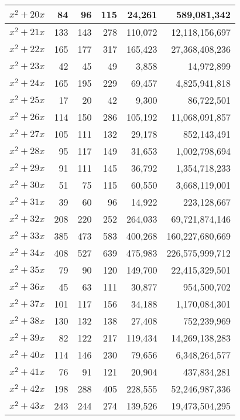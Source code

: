 \documentclass[a4paper]{amsproc}
\theoremstyle{plain}
\begin{document}
\begin{longtable}{ | l | r | r | r | r | r | }
$x^2 + 20x$ & 84 & 96 & 115 & 24{,}261 & 589{,}081{,}342 \\ \hline
$x^2 + 21x$ & 133 & 143 & 278 & 110{,}072 & 12{,}118{,}156{,}697 \\ \hline
$x^2 + 22x$ & 165 & 177 & 317 & 165{,}423 & 27{,}368{,}408{,}236 \\ \hline
$x^2 + 23x$ & 42 & 45 & 49 & 3{,}858 & 14{,}972{,}899 \\ \hline
$x^2 + 24x$ & 165 & 195 & 229 & 69{,}457 & 4{,}825{,}941{,}818 \\ \hline
$x^2 + 25x$ & 17 & 20 & 42 & 9{,}300 & 86{,}722{,}501 \\ \hline
$x^2 + 26x$ & 114 & 150 & 286 & 105{,}192 & 11{,}068{,}091{,}857 \\ \hline
$x^2 + 27x$ & 105 & 111 & 132 & 29{,}178 & 852{,}143{,}491 \\ \hline
$x^2 + 28x$ & 95 & 117 & 149 & 31{,}653 & 1{,}002{,}798{,}694 \\ \hline
$x^2 + 29x$ & 91 & 111 & 145 & 36{,}792 & 1{,}354{,}718{,}233 \\ \hline
$x^2 + 30x$ & 51 & 75 & 115 & 60{,}550 & 3{,}668{,}119{,}001 \\ \hline
$x^2 + 31x$ & 39 & 60 & 96 & 14{,}922 & 223{,}128{,}667 \\ \hline
$x^2 + 32x$ & 208 & 220 & 252 & 264{,}033 & 69{,}721{,}874{,}146 \\ \hline
$x^2 + 33x$ & 385 & 473 & 583 & 400{,}268 & 160{,}227{,}680{,}669 \\ \hline
$x^2 + 34x$ & 408 & 527 & 639 & 475{,}983 & 226{,}575{,}999{,}712 \\ \hline
$x^2 + 35x$ & 79 & 90 & 120 & 149{,}700 & 22{,}415{,}329{,}501 \\ \hline
$x^2 + 36x$ & 45 & 63 & 111 & 30{,}877 & 954{,}500{,}702 \\ \hline
$x^2 + 37x$ & 101 & 117 & 156 & 34{,}188 & 1{,}170{,}084{,}301 \\ \hline
$x^2 + 38x$ & 130 & 132 & 138 & 27{,}408 & 752{,}239{,}969 \\ \hline
$x^2 + 39x$ & 82 & 122 & 217 & 119{,}434 & 14{,}269{,}138{,}283 \\ \hline
$x^2 + 40x$ & 114 & 146 & 230 & 79{,}656 & 6{,}348{,}264{,}577 \\ \hline
$x^2 + 41x$ & 76 & 91 & 121 & 20{,}904 & 437{,}834{,}281 \\ \hline
$x^2 + 42x$ & 198 & 288 & 405 & 228{,}555 & 52{,}246{,}987{,}336 \\ \hline
$x^2 + 43x$ & 243 & 244 & 274 & 139{,}526 & 19{,}473{,}504{,}295 \\ \hline

\end{longtable}
\end{document}
